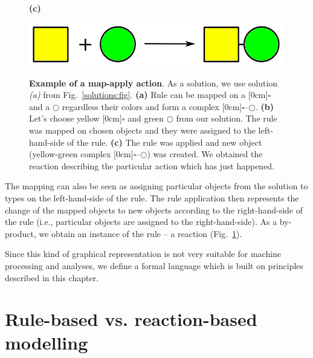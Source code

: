 \documentclass[12pt]{fithesis2}
\begin{document}
\begin{figure}[!h]
\begin{center}
\begin{minipage}[l]{0.1\textwidth}
    \textbf{(c)}
  \end{minipage}
  \begin{minipage}[r]{0.6\textwidth}
    {\hspace*{1.3cm}\includegraphics[scale=0.2]{pics/rule_reaction}}
\end{minipage}
\caption{\textbf{Example of a map-apply action}. As a solution, we use solution \textit{(a)} from Fig.~\ref{solutions:fig}. \textbf{(a)} Rule can be mapped on a \raisebox{-0.02cm}[0cm]{{\large $\square$}} and a $\bigcirc$ regardless their colors and form a complex \raisebox{-0.02cm}[0cm]{{\large $\square$}}--$\bigcirc$.  \textbf{(b)} Let's choose yellow \raisebox{-0.02cm}[0cm]{{\large $\square$}} and green $\bigcirc$ from our solution. The rule was mapped on chosen objects and they were assigned to the left-hand-side of the rule. \textbf{(c)} The rule was applied and new object (yellow-green complex \raisebox{-0.02cm}[0cm]{{\large $\square$}}--$\bigcirc$) was created. We obtained the reaction describing the particular action which has just happened.}
\label{map-apply:fig}
\end{center}
\end{figure}

The mapping can also be seen as assigning particular objects from the solution to types on the left-hand-side of the rule. The rule application then represents the change of the mapped objects to new objects according to the right-hand-side of the rule (i.e., particular objects are assigned to the right-hand-side). As a by-product, we obtain an instance of the rule -- a reaction (Fig.~\ref{map-apply:fig}). %

Since this kind of graphical representation is not very suitable for machine processing and analyses, we define a formal language which is built on principles described in this chapter.

\section{Rule-based vs. reaction-based modelling}
\end{document}
